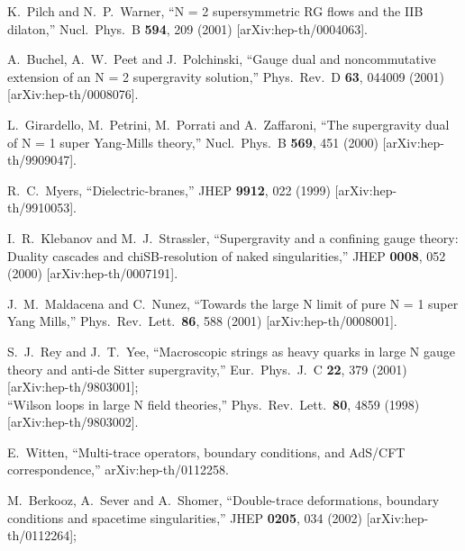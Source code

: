 \documentclass[12pt]{article}
\begin{document}
{\begin{thebibliography}{99}
  K.~Pilch and N.~P.~Warner,
  ``N = 2 supersymmetric RG flows and the IIB dilaton,''
  Nucl.\ Phys.\  B {\bf 594}, 209 (2001)
  [arXiv:hep-th/0004063].

  A.~Buchel, A.~W.~Peet and J.~Polchinski,
  ``Gauge dual and noncommutative extension of an N = 2 supergravity
  solution,''
  Phys.\ Rev.\  D {\bf 63}, 044009 (2001)
  [arXiv:hep-th/0008076].
  
  L.~Girardello, M.~Petrini, M.~Porrati and A.~Zaffaroni,
  ``The supergravity dual of N = 1 super Yang-Mills theory,''
  Nucl.\ Phys.\  B {\bf 569}, 451 (2000)
  [arXiv:hep-th/9909047].
  
  R.~C.~Myers,
  ``Dielectric-branes,''
  JHEP {\bf 9912}, 022 (1999)
  [arXiv:hep-th/9910053].
  
  I.~R.~Klebanov and M.~J.~Strassler,
  ``Supergravity and a confining gauge theory: Duality cascades and
  chiSB-resolution of naked singularities,''
  JHEP {\bf 0008}, 052 (2000)
  [arXiv:hep-th/0007191].
  
  J.~M.~Maldacena and C.~Nunez,
  ``Towards the large N limit of pure N = 1 super Yang Mills,''
  Phys.\ Rev.\ Lett.\  {\bf 86}, 588 (2001)
  [arXiv:hep-th/0008001].
  
  S.~J.~Rey and J.~T.~Yee,
  ``Macroscopic strings as heavy quarks in large N gauge theory and  anti-de
  Sitter supergravity,''
  Eur.\ Phys.\ J.\  C {\bf 22}, 379 (2001)
  [arXiv:hep-th/9803001];\\
  ``Wilson loops in large N field theories,''
  Phys.\ Rev.\ Lett.\  {\bf 80}, 4859 (1998)
  [arXiv:hep-th/9803002].
  
  E.~Witten,
  ``Multi-trace operators, boundary conditions, and AdS/CFT correspondence,''
  arXiv:hep-th/0112258.
  
  M.~Berkooz, A.~Sever and A.~Shomer,
  ``Double-trace deformations, boundary conditions and spacetime
  singularities,''
  JHEP {\bf 0205}, 034 (2002)
  [arXiv:hep-th/0112264];
  

\end{thebibliography}}
\end{document}
